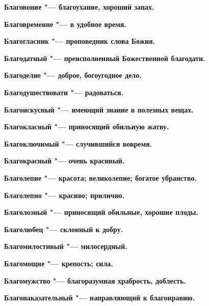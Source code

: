 \bfseries Благовоние \normalfont{} "--- благоухание, хороший запах. 




\bfseries Благовременне \normalfont{} "--- в удобное время. 




\bfseries Благогласник \normalfont{} "--- проповедник слова Божия. 




\bfseries Благодатный \normalfont{} "--- преисполненный Божественной благодати. 




\bfseries Благоделие \normalfont{} "--- доброе, богоугодное дело. 




\bfseries Благодушествовати \normalfont{} "--- радоваться. 




\bfseries Благоискусный \normalfont{} "--- имеющий знание в полезных вещах. 




\bfseries Благокласный \normalfont{} "--- приносящий обильную жатву. 




\bfseries Благоключимый \normalfont{} "--- случившийся вовремя. 




\bfseries Благокрасный \normalfont{} "--- очень красивый. 




\bfseries Благолепие \normalfont{} "--- красота; великолепие; богатое убранство. 




\bfseries Благолепно \normalfont{} "--- красиво; прилично. 




\bfseries Благолозный \normalfont{} "--- приносящий обильные, хорошие плоды. 




\bfseries Благолюбец \normalfont{} "--- склонный к добру. 




\bfseries Благомилостивый \normalfont{} "--- милосердный. 




\bfseries Благомощие \normalfont{} "--- крепость; сила. 




\bfseries Благомужство \normalfont{} "--- благоразумная храбрость, доблесть. 




\bfseries Благонаказательный \normalfont{} "--- направляющий к благонравию. 




